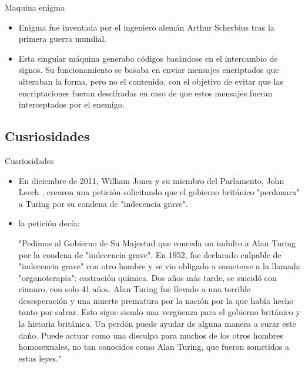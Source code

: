 \documentclass{beamer}
\begin{document}
\begin{frame}{Maquina enigma}
    \begin{itemize}
        \item Enigma fue inventada por el ingeniero alemán Arthur Scherbius tras la primera guerra mundial.\pause
        \item Esta singular máquina generaba códigos basándose en el intercambio de signos. Su funcionamiento se basaba en enviar mensajes encriptados que alteraban la forma, pero no el contenido, con el objetivo de evitar que las encriptaciones fueran descifradas en caso de que estos mensajes fueran interceptados por el enemigo.
    \end{itemize}
    
\end{frame}
\subsection{Cusriosidades}
\begin{frame}{Cusriosidades} 
    \begin{itemize}
        \item En diciembre de 2011, William Jones y su miembro del Parlamento, John Leech , crearon una petición solicitando que el gobierno británico "perdonara" a Turing por su condena de "indecencia grave".\pause
        \item la petición decía: 
        \begin{center}
            "Pedimos al Gobierno de Su Majestad que conceda un indulto a Alan Turing por la condena de "indecencia grave". En 1952, fue declarado culpable de "indecencia grave" con otro hombre y se vio obligado a someterse a la llamada "organoterapia": castración química. Dos años más tarde, se suicidó con cianuro, con solo 41 años. Alan Turing fue llevado a una terrible desesperación y una muerte prematura por la nación por la que había hecho tanto por salvar. Esto sigue siendo una vergüenza para el gobierno británico y la historia británica. Un perdón puede ayudar de alguna manera a curar este daño. Puede actuar como una disculpa para muchos de los otros hombres homosexuales, no tan conocidos como Alan Turing, que fueron sometidos a estas leyes."
        \end{center}
    \end{itemize}
\end{frame}
\end{document}
